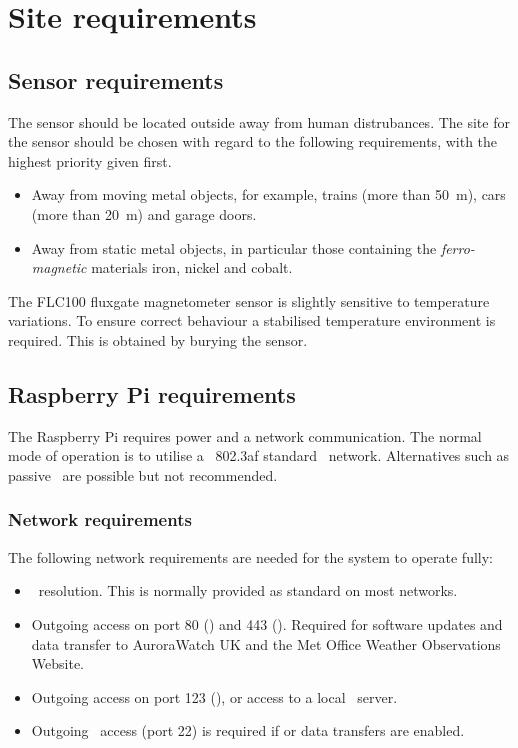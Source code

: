 \chapter{Site requirements}

\section{Sensor requirements}
The sensor should be located outside away from human distrubances. The
site for the sensor should be chosen with regard to the following
requirements, with the highest priority given first.

\begin{itemize}
\item Away from moving metal objects, for example, trains (more than
  \SI{50}{\metre}), cars (more than \SI{20}{\metre}) and garage doors.
\item Away from static metal objects, in particular those containing
  the \emph{ferro-magnetic} materials iron, nickel and cobalt.
\end{itemize}

The FLC100 fluxgate magnetometer sensor is slightly sensitive to
temperature variations. To ensure correct behaviour a stabilised
temperature environment is required. This is obtained by burying the
sensor.

\section{Raspberry Pi requirements}

The Raspberry Pi requires power and a network communication. The
normal mode of operation is to utilise a \ieee\ 802.3af standard \PoE\
network. Alternatives such as passive \PoE\ are possible but not
recommended.

\subsection{Network requirements}

The following network requirements are needed for the system to
operate fully:
\begin{itemize}
\item \dns\ resolution. This is normally provided
  as standard on most networks.
\item Outgoing access on port 80 (\http) and 443 (\https). Required
  for software updates and data transfer to AuroraWatch UK and the Met
  Office Weather Observations Website.
\item Outgoing access on port 123 (\ntp), or access to a local \ntp\
  server.
\item Outgoing \ssh\ access (port 22) is required if \code{rsync} or
   data transfers are enabled.
\end{itemize}




